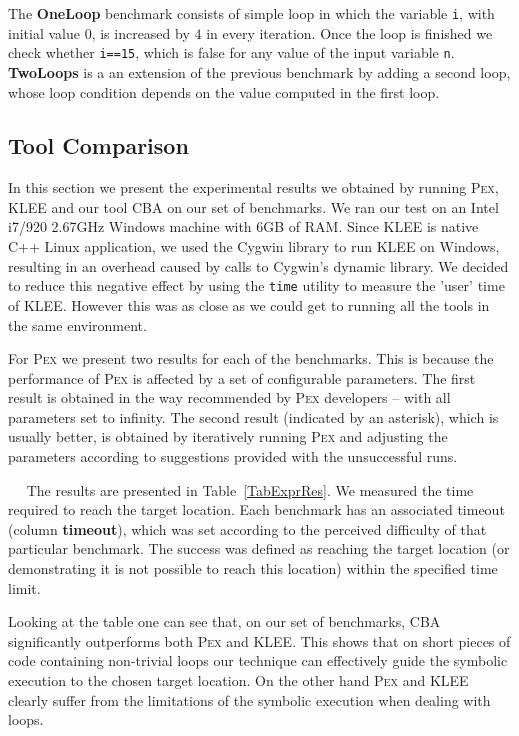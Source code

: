 \documentclass{llncs}
\newcommand{\Pex}{\textsc{Pex}\xspace}
\newcommand{\Klee}{\textsc{KLEE}\xspace}
\newcommand{\CBATool}{\textsc{CBA}\xspace}
\newcommand{\tout}{\textbf{timeout}}
\renewcommand{\paragraph}[1]{\vspace{0.2cm}\noindent{\bf #1}~~}
\begin{document}
The \textbf{OneLoop} benchmark consists of simple loop in which the variable
\texttt{i}, with initial value $0$, is increased by $4$ in every
iteration. Once the loop is finished we check whether \texttt{i==15}, which
is false for any value of the input variable \texttt{n}. 
 \textbf{TwoLoops} is a an
extension of the previous benchmark by adding a second loop, whose
loop condition depends on the value computed in the first loop.

\subsection{Tool Comparison}
In this section we present the experimental results we obtained by running
\Pex, \Klee and our tool \CBATool on our set of benchmarks.
 We ran our test on an Intel i7/920 2.67GHz Windows machine with 6GB
of RAM. 
Since \Klee is native C++ Linux application, we used the Cygwin library to
run \Klee on Windows, resulting in an overhead caused by calls to Cygwin's dynamic library. We
decided to reduce this negative effect by using the \texttt{time} utility to
measure the 'user' time of \Klee. However this was as close as we could get
to running all the tools in the same environment.

For \Pex we present two results for each of the benchmarks. This is because
the performance of \Pex is affected by a set of configurable
parameters. The first result is obtained in the way recommended by \Pex
developers -- with all parameters set to infinity. The second result
(indicated by an asterisk), which
is usually better, is obtained by iteratively running \Pex and adjusting the
parameters according to suggestions provided with the unsuccessful runs.

\paragraph{Comparison results}
The results are presented in Table~\ref{TabExprRes}. We measured the time
required to reach the target location. Each benchmark has an associated
timeout (column \tout), which was set according to the perceived difficulty of that
particular benchmark. The success was defined as reaching the target
location (or demonstrating it is not possible to reach this location) within
the specified time limit.

Looking at the table one can see that, on our set of benchmarks, \CBATool
significantly outperforms both \Pex and \Klee. This shows that on short
pieces of code containing non-trivial loops our technique can effectively
guide the symbolic execution to the chosen target location. On the other
hand \Pex and \Klee clearly suffer from the limitations of the symbolic
execution when dealing with loops.
\end{document}
